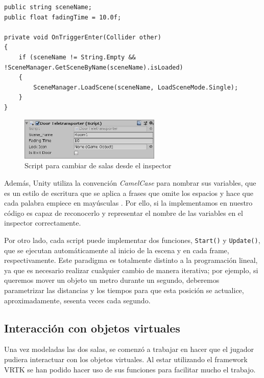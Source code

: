 \begin{lstlisting}[caption=Fragmento del script para viajar entre salas, label=lst:viajar-salas]
public string sceneName;
public float fadingTime = 10.0f;

private void OnTriggerEnter(Collider other)
{
    if (sceneName != String.Empty && !SceneManager.GetSceneByName(sceneName).isLoaded)
    {
        SceneManager.LoadScene(sceneName, LoadSceneMode.Single);
    }
}
\end{lstlisting}

\begin{figure}[!h]
\begin{center}
\includegraphics[width=0.6\textwidth]{imagenes/7/door-teleporter-inspector.jpg}
\caption{Script para cambiar de salas desde el inspector}
\label{fig:door-teleporter-inspector}
\end{center}
\end{figure}

Además, Unity utiliza la convención \textit{CamelCase} para nombrar sus variables, que es un estilo de escritura que se aplica a frases que omite los espacios y hace que cada palabra empiece en mayúsculas . Por ello, si la implementamos en nuestro código es capaz de reconocerlo y representar el nombre de las variables en el inspector correctamente.

Por otro lado, cada script puede implementar dos funciones, \texttt{Start()} y \texttt{Update()}, que se ejecutan automáticamente al inicio de la escena y en cada frame, respectivamente. Este paradigma es totalmente distinto a la programación lineal, ya que es necesario realizar cualquier cambio de manera iterativa; por ejemplo, si queremos mover un objeto un metro durante un segundo, deberemos parametrizar las distancias y los tiempos para que esta posición se actualice, aproximadamente, sesenta veces cada segundo.

\subsection{Interacción con objetos virtuales}

Una vez modeladas las dos salas, se comenzó a trabajar en hacer que el jugador pudiera interactuar con los objetos virtuales. Al estar utilizando el framework \acs{VRTK} se han podido hacer uso de sus funciones para facilitar mucho el trabajo.


